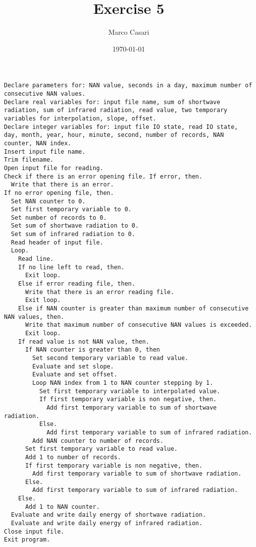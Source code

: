 \documentclass[a4paper,10pt]{article}
\begin{document}
\title{Exercise 5}
\author{Marco Casari}
\date{\today}
\maketitle

\lstset{
  basicstyle=\ttfamily,
  breakatwhitespace=false,
  breaklines=true,
  columns=fullflexible,
  keepspaces=true,
  numbers=left
}
\begin{lstlisting}
Declare parameters for: NAN value, seconds in a day, maximum number of consecutive NAN values.
Declare real variables for: input file name, sum of shortwave radiation, sum of infrared radiation, read value, two temporary variables for interpolation, slope, offset.
Declare integer variables for: input file IO state, read IO state, day, month, year, hour, minute, second, number of records, NAN counter, NAN index.
Insert input file name.
Trim filename.
Open input file for reading.
Check if there is an error opening file. If error, then.
  Write that there is an error.
If no error opening file, then.
  Set NAN counter to 0.
  Set first temporary variable to 0.
  Set number of records to 0.
  Set sum of shortwave radiation to 0.
  Set sum of infrared radiation to 0.
  Read header of input file.
  Loop.
    Read line.
    If no line left to read, then.
      Exit loop.
    Else if error reading file, then.
      Write that there is an error reading file.
      Exit loop.
    Else if NAN counter is greater than maximum number of consecutive NAN values, then.
      Write that maximum number of consecutive NAN values is exceeded.
      Exit loop.
    If read value is not NAN value, then.
      If NAN counter is greater than 0, then
        Set second temporary variable to read value.
        Evaluate and set slope.
        Evaluate and set offset.
        Loop NAN index from 1 to NAN counter stepping by 1.
          Set first temporary variable to interpolated value.
          If first temporary variable is non negative, then.
            Add first temporary variable to sum of shortwave radiation.
          Else.
            Add first temporary variable to sum of infrared radiation.
        Add NAN counter to number of records.
      Set first temporary variable to read value.
      Add 1 to number of records.
      If first temporary variable is non negative, then.
        Add first temporary variable to sum of shortwave radiation.
      Else.
        Add first temporary variable to sum of infrared radiation.
    Else.
      Add 1 to NAN counter.
  Evaluate and write daily energy of shortwave radiation.
  Evaluate and write daily energy of infrared radiation.
Close input file.
Exit program.
\end{lstlisting}
\end{document}
